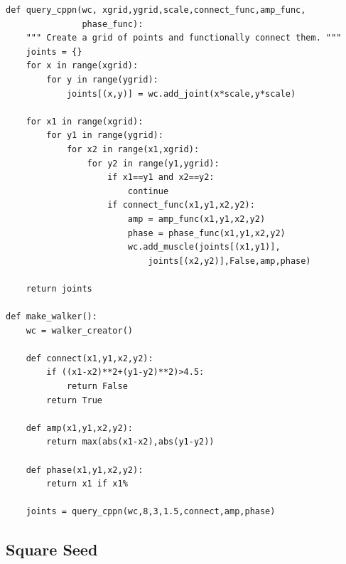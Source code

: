 \documentclass{article}
\begin{document}
\begin{verbatim}
def query_cppn(wc, xgrid,ygrid,scale,connect_func,amp_func,
               phase_func):
    """ Create a grid of points and functionally connect them. """
    joints = {}
    for x in range(xgrid):
        for y in range(ygrid):
            joints[(x,y)] = wc.add_joint(x*scale,y*scale)

    for x1 in range(xgrid):
        for y1 in range(ygrid):
            for x2 in range(x1,xgrid):
                for y2 in range(y1,ygrid):
                    if x1==y1 and x2==y2:
                        continue
                    if connect_func(x1,y1,x2,y2):
                        amp = amp_func(x1,y1,x2,y2)
                        phase = phase_func(x1,y1,x2,y2)
                        wc.add_muscle(joints[(x1,y1)],
                            joints[(x2,y2)],False,amp,phase)

    return joints

def make_walker():
    wc = walker_creator()

    def connect(x1,y1,x2,y2):
        if ((x1-x2)**2+(y1-y2)**2)>4.5:
            return False
        return True

    def amp(x1,y1,x2,y2):
        return max(abs(x1-x2),abs(y1-y2))

    def phase(x1,y1,x2,y2):
        return x1 if x1%

    joints = query_cppn(wc,8,3,1.5,connect,amp,phase)
\end{verbatim}

\subsection{Square Seed}
\label{source:square}
\end{document}
